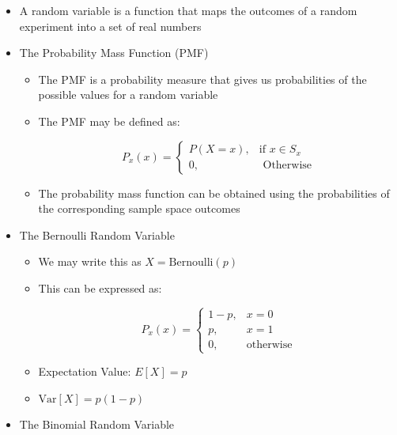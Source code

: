 \begin{itemize}

  \item A random variable is a function that maps the outcomes of a random experiment into a set of real numbers

  \item The Probability Mass Function (PMF)

    \begin{itemize}

      \item The PMF is a probability measure that gives us probabilities of the possible values for a random variable

      \item The PMF may be defined as:

        $$P_x(x)=\left\{ \begin{array}{ll} P(X=x), & \text{if }x\in S_x\\ 0, & \text{ Otherwise}\end{array}$$

      \item The probability mass function can be obtained using the probabilities of the corresponding sample space outcomes

    \end{itemize}

  \item The Bernoulli Random Variable

    \begin{itemize}

      \item We may write this as $X=\text{Bernoulli}(p)$

      \item This can be expressed as:

        $$P_x(x)=\left\{ \begin{array}{ll} 1-p,&x=0\\p,&x=1\\0,&\text{otherwise}\end{array}$$

        \item Expectation Value: $E[X]=p$

        \item $\text{Var}[X]=p(1-p)$

    \end{itemize}

  \item The Binomial Random Variable


\end{itemize}
